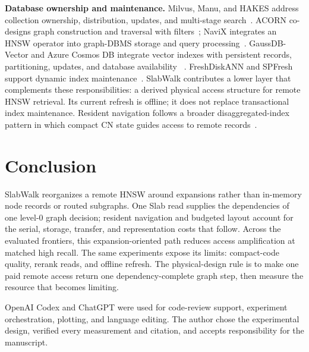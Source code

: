 \documentclass[sigconf,nonacm]{acmart}
\begin{document}
\textbf{Database ownership and maintenance.}
Milvus, Manu, and HAKES address collection ownership, distribution, updates,
and multi-stage search~\cite{milvus,manu,hakes}.  ACORN co-designs graph
construction and traversal with filters~\cite{acorn}; NaviX integrates an HNSW
operator into graph-DBMS storage and query processing~\cite{navix}.
GaussDB-Vector and Azure Cosmos DB integrate vector indexes with persistent
records, partitioning, updates, and database availability
~\cite{gaussdbvector,cosmosvector}.  FreshDiskANN and SPFresh support dynamic
index maintenance~\cite{freshdiskann,spfresh}.  SlabWalk contributes a lower
layer that complements these responsibilities: a derived physical access
structure for remote HNSW retrieval.  Its current refresh is offline; it does
not replace transactional index maintenance.  Resident navigation follows a
broader disaggregated-index pattern in which compact CN state guides access to
remote records~\cite{xstore,rolex,sherman,chime,dex}.

\section{Conclusion}
\label{sec:conclusion}

SlabWalk reorganizes a remote HNSW around expansions rather than in-memory node
records or routed subgraphs.  One Slab read supplies the dependencies of one
level-0 graph decision; resident navigation and budgeted layout account for the
serial, storage, transfer, and representation costs that follow.  Across the
evaluated frontiers, this expansion-oriented path reduces access amplification
at matched high recall.  The same experiments expose its limits: compact-code quality,
rerank reads, and offline refresh.  The physical-design rule is to make one
paid remote access return one dependency-complete graph step, then measure the
resource that becomes limiting.

\FloatBarrier
\begin{acks}
OpenAI Codex and ChatGPT were used for code-review support, experiment
orchestration, plotting, and language editing.  The author chose the
experimental design, verified every measurement and citation, and accepts
responsibility for the manuscript.
\end{acks}



\end{document}
